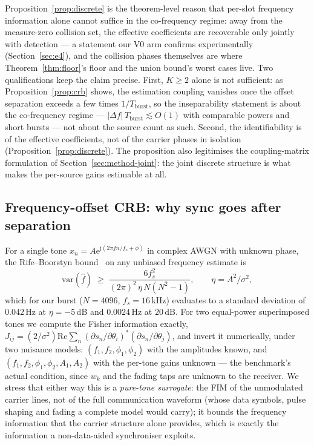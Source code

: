 \documentclass[journal]{IEEEtran}
\newcommand{\ee}{\mathrm{e}}
\newcommand{\jj}{\mathrm{j}}
\begin{document}
Proposition~\ref{prop:discrete} is the theorem-level reason that
per-slot frequency information alone cannot suffice in the co-frequency
regime: away from the measure-zero collision set, the effective
coefficients are recoverable only jointly with detection --- a
statement our V0 arm confirms experimentally
(Section~\ref{sec:e4}), and the collision phases themselves are where
Theorem~\ref{thm:floor}'s floor and the union bound's worst cases
live. Two qualifications keep the claim precise. First, $K \geq 2$
alone is not sufficient: as Proposition~\ref{prop:crb} shows, the
estimation coupling vanishes once the offset separation exceeds a few
times $1/T_{\mathrm{burst}}$, so the inseparability statement is about
the co-frequency regime --- $|\Delta f| \, T_{\mathrm{burst}} \lesssim
O(1)$ with comparable powers and short bursts --- not about the source
count as such. Second, the identifiability is of the effective
coefficients, not of the carrier phases in isolation
(Proposition~\ref{prop:discrete}). The proposition also legitimises
the coupling-matrix formulation of Section~\ref{sec:method-joint}: the
joint discrete structure is what makes the per-source gains estimable
at all.

\subsection{Frequency-offset CRB: why sync goes after separation}
\label{sec:theory-crb}

For a single tone $x_n = A \ee^{\jj(2\pi f n / f_s + \phi)}$ in complex
AWGN with unknown phase, the Rife--Boorstyn
bound~\cite{rife1974single} on any unbiased frequency estimate is
\begin{equation}
  \mathrm{var}(\hat{f}) \;\geq\;
  \frac{6 f_s^2}{(2\pi)^2 \, \eta \, N (N^2 - 1)},
  \qquad \eta = A^2 / \sigma^2,
  \label{eq:rb}
\end{equation}
which for our burst ($N = 4096$, $f_s = 16$\,kHz) evaluates to a
standard deviation of $0.042$\,Hz at $\eta = -5$\,dB and $0.0024$\,Hz
at $20$\,dB. For two equal-power superimposed tones we compute the
Fisher information exactly, $J_{ij} = (2/\sigma^2) \mathrm{Re} \sum_n
(\partial s_n / \partial \theta_i)^* (\partial s_n / \partial
\theta_j)$, and invert it numerically, under two nuisance models:
$(f_1, f_2, \phi_1, \phi_2)$ with the amplitudes known, and
$(f_1, f_2, \phi_1, \phi_2, A_1, A_2)$ with the per-tone gains unknown
--- the benchmark's actual condition, since $w_k$ and the fading taps
are unknown to the receiver. We stress that either way this is a
\emph{pure-tone surrogate}: the FIM of the unmodulated carrier lines,
not of the full communication waveform (whose data symbols, pulse
shaping and fading a complete model would carry); it bounds the
frequency information that the carrier structure alone provides, which
is exactly the information a non-data-aided synchroniser exploits.
\end{document}
